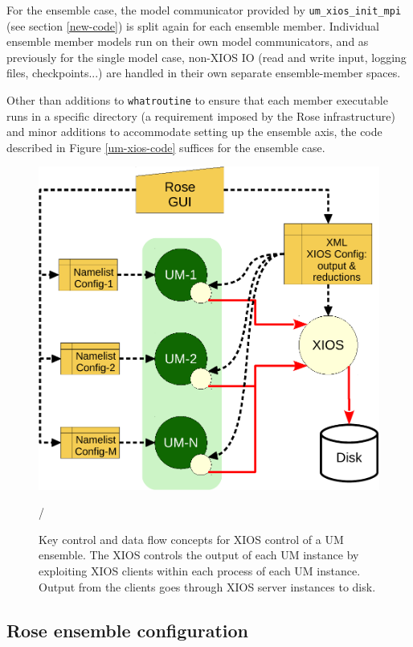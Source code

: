 \documentclass[twocolumn, 5p, times]{elsarticle}
\begin{document}
For the ensemble case, the model communicator provided by \texttt{um\_xios\_init\_mpi} (see section \ref{new-code}) is split again for each ensemble member. Individual ensemble member models run on their own model communicators, and as previously for the single model case, non-XIOS IO (read and write input, logging files, checkpoints...) are handled in their own separate ensemble-member spaces. 

Other than additions to \texttt{whatroutine} to ensure that each member executable runs in a specific directory (a requirement imposed by the Rose infrastructure) and minor additions to accommodate setting up the ensemble axis, the code described in Figure \ref{um-xios-code} suffices for the ensemble case.

\begin{figure}
	\centerline{
	\includegraphics[scale=0.5]{figures/xios_figures_b.pdf}}
	\caption {
		Key control and data flow concepts for XIOS control of a UM ensemble. The XIOS controls
		the output of each UM instance by exploiting
		XIOS clients within each process of each UM instance. Output from the clients goes through
		XIOS server instances to disk. 
		}\label{fig-xios-layout}/
\end{figure}

\subsection{Rose ensemble configuration}
\end{document}
